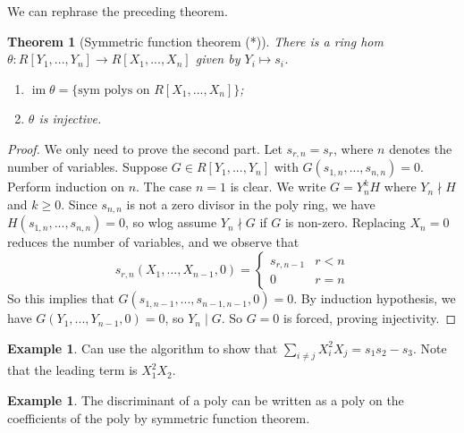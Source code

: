 \documentclass{article}
\theoremstyle{definition}
\newtheorem{example}[defn]{Example}
\theoremstyle{remark}
\theoremstyle{plain}
\newtheorem*{thm*}{Theorem}
\begin{document}
We can rephrase the preceding theorem.
\begin{thm*}[Symmetric function theorem (*)]
    There is a ring hom $\theta:R[Y_1,...,Y_n]\to R[X_1,...,X_n]$ given by $Y_i\mapsto s_i$.
    \begin{enumerate}
        \item $\operatorname{im}\theta=\{\text{sym polys on }R[X_1,...,X_n]\}$;
        \item $\theta$ is injective.
    \end{enumerate}
\end{thm*}
\begin{proof}
We only need to prove the second part. Let $s_{r,n}=s_r$, where $n$ denotes the number of variables. Suppose $G\in R[Y_1,...,Y_n]$ with $G(s_{1,n},...,s_{n,n})=0$. Perform induction on $n$. The case $n=1$ is clear. We write $G=Y_n^kH$ where $Y_n\nmid H$ and $k\ge0$. Since $s_{n,n}$ is not a zero divisor in the poly ring, we have $H(s_{1,n},...,s_{n,n})=0$, so wlog assume $Y_n\nmid G$ if $G$ is non-zero. Replacing $X_n=0$ reduces the number of variables, and we observe that 
\[s_{r,n}(X_1,...,X_{n-1},0)=\begin{cases}
    s_{r,n-1} & r<n\\
    0 & r=n
\end{cases}\]
So this implies that $G(s_{1,n-1},...,s_{n-1,n-1},0)=0$. By induction hypothesis, we have $G(Y_1,...,Y_{n-1},0)=0$, so $Y_n\mid G$. So $G=0$ is forced, proving injectivity.
\end{proof}
\begin{example}
    Can use the algorithm to show that $\sum_{i\neq j}X_i^2X_j=s_1s_2-s_3$. Note that the leading term is $X_1^2X_2$.
\end{example}
\begin{example}
The discriminant of a poly can be written as a poly on the coefficients of the poly by symmetric function theorem.
\end{example}
\end{document}
